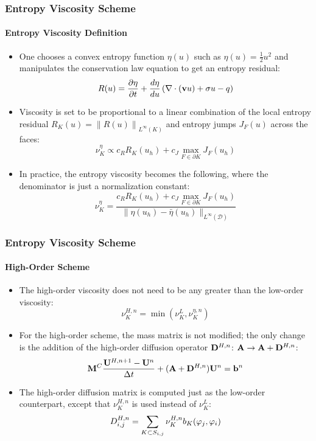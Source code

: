 \documentclass{beamer}
\begin{document}
\begin{frame}
\frametitle{Entropy Viscosity Scheme}
\framesubtitle{Entropy Viscosity Definition}

\begin{itemize}
   \item One chooses a convex entropy function $\eta(u)$ such
   as $\eta(u)=\frac{1}{2}u^2$ and manipulates the
   conservation law equation to get an entropy residual:
   \begin{equation}
      R(u) = \frac{\partial \eta}{\partial t}
      + \frac{d\eta}{du}\left(\nabla\cdot(\mathbf{v}u)
      + \sigma u 
      - q \right)
   \end{equation}
   \item Viscosity is set to be proportional to a linear combination
      of the local entropy residual $R_K(u) = \left\|R(u)\right\|_{L^\infty(K)}$
      and entropy jumps $J_F(u)$ across the faces:
      \begin{equation}
         \nu^{\eta}_K \propto c_R R_K(u_h)
         + c_J\max\limits_{F\in\partial K}J_F(u_h)
      \end{equation}
   \item In practice, the entropy viscosity becomes the following, where the
      denominator is just a normalization constant:
      \begin{equation}
         \nu^{\eta}_K = \frac{c_R R_K(u_h)
         + c_J\max\limits_{F\in\partial K}J_F(u_h)}
         {\|\eta(u_h)-\bar{\eta}(u_h)\|_{L^\infty(\mathcal{D})}}
      \end{equation}
\end{itemize}
   
\end{frame}
\begin{frame}
\frametitle{Entropy Viscosity Scheme}
\framesubtitle{High-Order Scheme}

\begin{itemize}
   \item The high-order viscosity does not need to be any greater than the
      low-order viscosity:
      \begin{equation}
         \nu^{H,n}_K = \min(\nu^{L}_K,\nu^{\eta,n}_K)
      \end{equation}
   \item For the high-order scheme, the mass matrix is not modified; the
      only change is the addition of the high-order diffusion operator
      $\mathbf{D}^{H,n}$: $\mathbf{A} \rightarrow \mathbf{A} + \mathbf{D}^{H,n}$:
      \begin{equation}
         \mathbf{M}^C\frac{\mathbf{U}^{H,n+1}-\mathbf{U}^n}{\Delta t} + (\mathbf{A} + \mathbf{D}^{H,n})\mathbf{U}^n = \mathbf{b}^n
      \end{equation}
   \item The high-order diffusion matrix is computed just as the low-order
      counterpart, except that $\nu^{H,n}_K$ is used instead of $\nu^{L}_K$:
      \begin{equation}
         D_{i,j}^{H,n} = \sum\limits_{K\subset S_{i,j}}\nu_K^{H,n}
            b_K(\varphi_j,\varphi_i)
      \end{equation}
\end{itemize}

\end{frame}
\end{document}
